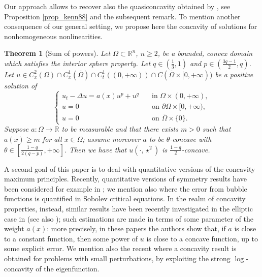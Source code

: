 \documentclass[11pt, reqno]{amsart}
\newtheorem{theorem}[lemma]{Theorem}
\theoremstyle{definition}
\numberwithin{equation}{section}
\newcommand{\Omegabar}{\overline{\Omega}}
\newcommand{\R}{\mathbb{R}}
\begin{document}
Our approach allows to recover also the quasiconcavity obtained by \cite{kenningtonparabolic}, see Proposition \ref{prop_kenn88} and the subsequent remark. 
To mention another consequence of our general setting, we propose here the concavity of solutions for nonhomogeneous nonlinearities.
\begin{theorem}[Sum of powers]
\label{thm_sum_powers}
 	Let $\Omega \subset \R^n$, $n\geq 2$, be a bounded, convex domain which satisfies the interior sphere property.
	 Let $q\in (\frac{1}{3},1)$ and $p\in (\frac{3q-1}{2},q)$.
	Let $u\in C^2_x(\Omega)\cap C^1_x(\Omegabar) \cap C^1_t((0,+\infty)) \cap C(\Omegabar\times [0,+\infty))$ be a positive solution of 
	$$		
\begin{cases}
u_t-\Delta u= a(x) u^p+u^q &\quad\text{in }\Omega\times (0,+\infty), \\
u=0 & \quad\text{on }\partial \Omega\times [0,+\infty),	 \\
u =0 & \quad \text{on } \Omegabar \times \{0\}.
\end{cases}
$$
Suppose $a\colon \Omega \to \R$ to be measurable and that there exists $m>0$ such that $a(x)\geq m$ for all $x\in \Omega$; assume moreover $a$ to be $\theta$-concave with $\theta \in [\frac{1-q}{2(q-p)}, +\infty]$.
Then we have that $u(\cdot, \star^{2})$ is $\frac{1-q}{2}$-concave. 
\end{theorem}

A second goal of this paper is to deal with quantitative versions of the concavity maximum principles. Recently, quantitative versions of symmetry results have been considered for example in \cite{Ciraolo-Cozzi-Perugini-Pollastro, Gat25, ABMP24, DSPV24};
we mention also \cite{CiraoloFigalliMaggi2018, DengSunWei2025} where the error from bubble functions is quantified in Sobolev critical equations.
In the realm of concavity properties, instead, similar results have been recently investigated in the elliptic case in \cite{BuSq19} (see also \cite{ABCSnonautonomousellipticequation, GaSq24}); such estimations are made in terms of some parameter of the weight $a(x)$: more precisely, in these papers the authors show that, if $a$ is close to a constant function, then some power of $u$ is close to a concave function, up to some explicit error.
We mention also the recent \cite{HamelNadirashvili2025} where a concavity %
result is obtained for problems with small perturbations, %
by exploiting the strong $\log$-concavity of the eigenfunction.%
\end{document}
